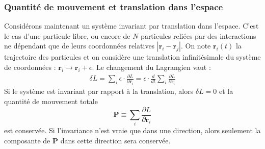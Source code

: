 \subsubsection{Quantité de mouvement et translation dans l'espace}
Considérons maintenant un système invariant par translation dans l'espace. C'est le cas d'une particule libre, ou encore de $N$ particules reliées par des interactions ne dépendant que de leurs coordonnées relatives $\left|\bm{r}_i-\bm{r}_j\right|$. 
On note $\bm{r}_i(t)$ la trajectoire des particules et on considère une translation infinitésimale du système de coordonnées : $\bm{r}_i\rightarrow \bm{r}_i+\epsilon$. Le changement du Lagrangien vaut :
\begin{align}
\delta L =\sum_i \epsilon\cdot\frac{\partial L}{\partial \bm{r}_i}= \epsilon\cdot\frac{d}{dt}\sum_i \frac{\partial L}{\partial {\dot{\bm{r}}}_i}
\end{align}
Si le système est invariant par rapport à la translation, alors $\delta L=0$ et la quantité de mouvement totale
\begin{equation}
\bm{P}\equiv\sum_i\frac{\partial L}{\partial \dot{\bm{r}}_i}
\end{equation}
est conservée. Si l'invariance n'est vraie que dans une direction, alors seulement la composante de $\bm{P}$ dans cette direction sera conservée.


